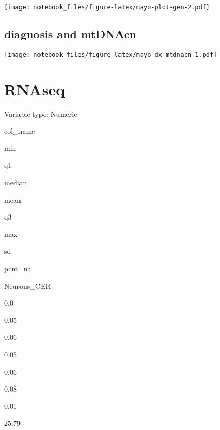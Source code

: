 \documentclass[]{book}
\newenvironment{Shaded}{\begin{snugshade}}{\end{snugshade}}
\newcommand{\DataTypeTok}[1]{\textcolor[rgb]{0.13,0.29,0.53}{#1}}
\newcommand{\DecValTok}[1]{\textcolor[rgb]{0.00,0.00,0.81}{#1}}
\newcommand{\KeywordTok}[1]{\textcolor[rgb]{0.13,0.29,0.53}{\textbf{#1}}}
\newcommand{\NormalTok}[1]{#1}
\newcommand{\OperatorTok}[1]{\textcolor[rgb]{0.81,0.36,0.00}{\textbf{#1}}}
\newcommand{\StringTok}[1]{\textcolor[rgb]{0.31,0.60,0.02}{#1}}
\begin{document}
\texttt{[image: notebook\_files/figure-latex/mayo-plot-gen-2.pdf]}

\hypertarget{diagnosis-and-mtdnacn}{%
\subsection{diagnosis and mtDNAcn}\label{diagnosis-and-mtdnacn}}

\begin{Shaded}
\end{Shaded}

\texttt{[image: notebook\_files/figure-latex/mayo-dx-mtdnacn-1.pdf]}

\hypertarget{rnaseq}{%
\section{RNAseq}\label{rnaseq}}

\label{tab:mayo-rna-numeric}Variable type: Numeric

col\_name

min

q1

median

mean

q3

max

sd

pcnt\_na

Neurons\_CER

0.0

0.05

0.06

0.05

0.06

0.08

0.01

25.79
\end{document}
